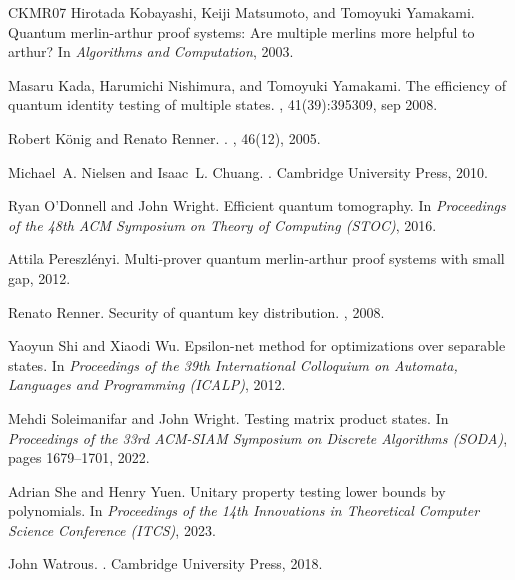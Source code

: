 \documentclass[10pt,a4paper]{article}
\theoremstyle{remark}
\newcommand{\1}[1]{\mathds{1}{[#1]}}
\numberwithin{equation}{section}
\begin{document}
\begin{thebibliography}{CKMR07}
Hirotada Kobayashi, Keiji Matsumoto, and Tomoyuki Yamakami.
\newblock Quantum merlin-arthur proof systems: Are multiple merlins more helpful to arthur?
\newblock In {\em Algorithms and Computation}, 2003.

Masaru Kada, Harumichi Nishimura, and Tomoyuki Yamakami.
\newblock The efficiency of quantum identity testing of multiple states.
, 41(39):395309, sep 2008.

Robert König and Renato Renner.
.
, 46(12), 2005.

Michael~A. Nielsen and Isaac~L. Chuang.
.
\newblock Cambridge University Press, 2010.

Ryan O'Donnell and John Wright.
\newblock Efficient quantum tomography.
\newblock In {\em Proceedings of the 48th ACM Symposium on Theory of Computing (STOC)}, 2016.

Attila Pereszlényi.
\newblock Multi-prover quantum merlin-arthur proof systems with small gap, 2012.

Renato Renner.
\newblock Security of quantum key distribution.
, 2008.

Yaoyun Shi and Xiaodi Wu.
\newblock Epsilon-net method for optimizations over separable states.
\newblock In {\em Proceedings of the 39th International Colloquium on Automata, Languages and Programming (ICALP)}, 2012.

Mehdi Soleimanifar and John Wright.
\newblock Testing matrix product states.
\newblock In {\em Proceedings of the 33rd ACM-SIAM Symposium on Discrete Algorithms (SODA)}, pages 1679--1701, 2022.

Adrian She and Henry Yuen.
\newblock Unitary property testing lower bounds by polynomials.
\newblock In {\em Proceedings of the 14th Innovations in Theoretical Computer Science Conference (ITCS)}, 2023.

John Watrous.
.
\newblock Cambridge University Press, 2018.

\end{thebibliography}
\end{document}
